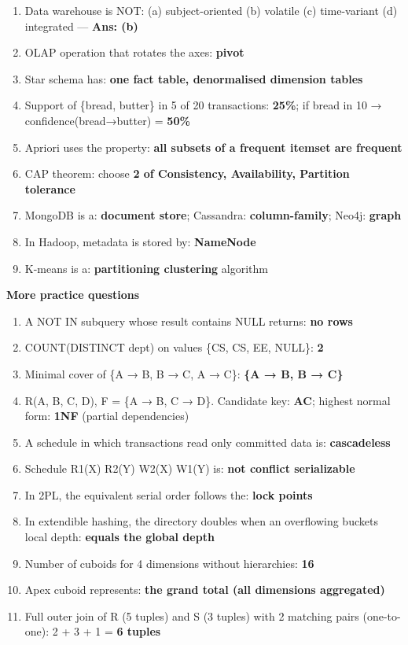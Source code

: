 \begin{enumerate}
\def\labelenumi{\arabic{enumi}.}
\setcounter{enumi}{42}
\tightlist
\item
  Data warehouse is NOT: (a) subject-oriented (b) volatile (c) time-variant (d) integrated --- \textbf{Ans: (b)}
\item
  OLAP operation that rotates the axes: \textbf{pivot}
\item
  Star schema has: \textbf{one fact table, denormalised dimension tables}
\item
  Support of \{bread, butter\} in 5 of 20 transactions: \textbf{25\%}; if bread in 10 → confidence(bread→butter) = \textbf{50\%}
\item
  Apriori uses the property: \textbf{all subsets of a frequent itemset are frequent}
\item
  CAP theorem: choose \textbf{2 of Consistency, Availability, Partition tolerance}
\item
  MongoDB is a: \textbf{document store}; Cassandra: \textbf{column-family}; Neo4j: \textbf{graph}
\item
  In Hadoop, metadata is stored by: \textbf{NameNode}
\item
  K-means is a: \textbf{partitioning clustering} algorithm
\end{enumerate}

\textbf{More practice questions}

\begin{enumerate}
\def\labelenumi{\arabic{enumi}.}
\setcounter{enumi}{51}
\tightlist
\item
  A NOT IN subquery whose result contains NULL returns: \textbf{no rows}
\item
  COUNT(DISTINCT dept) on values \{CS, CS, EE, NULL\}: \textbf{2}
\item
  Minimal cover of \{A → B, B → C, A → C\}: \textbf{\{A → B, B → C\}}
\item
  R(A, B, C, D), F = \{A → B, C → D\}. Candidate key: \textbf{AC}; highest normal form: \textbf{1NF} (partial dependencies)
\item
  A schedule in which transactions read only committed data is: \textbf{cascadeless}
\item
  Schedule R1(X) R2(Y) W2(X) W1(Y) is: \textbf{not conflict serializable}
\item
  In 2PL, the equivalent serial order follows the: \textbf{lock points}
\item
  In extendible hashing, the directory doubles when an overflowing bucket\textquotesingle s local depth: \textbf{equals the global depth}
\item
  Number of cuboids for 4 dimensions without hierarchies: \textbf{16}
\item
  Apex cuboid represents: \textbf{the grand total (all dimensions aggregated)}
\item
  Full outer join of R (5 tuples) and S (3 tuples) with 2 matching pairs (one-to-one): 2 + 3 + 1 = \textbf{6 tuples}
\end{enumerate}


